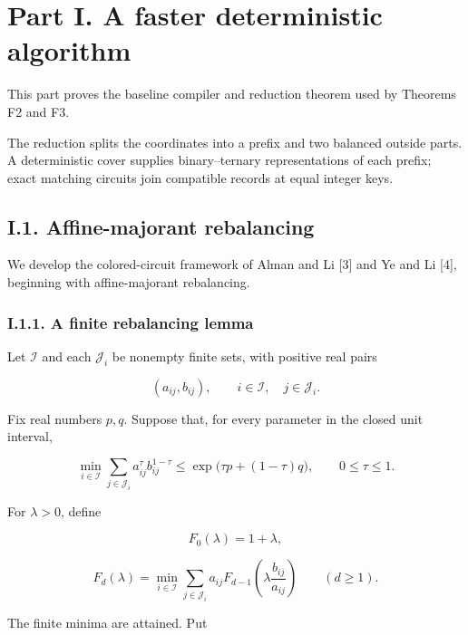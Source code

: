 \hypertarget{af-a9ec399514-part-i.-a-faster-deterministic-algorithm}{%
\section{Part I. A faster deterministic algorithm}\label{af-a9ec399514-part-i.-a-faster-deterministic-algorithm}}

This part proves the baseline compiler and reduction theorem used by Theorems F2 and F3.

The reduction splits the coordinates into a prefix and two balanced outside parts. A deterministic cover supplies binary--ternary representations of each prefix; exact matching circuits join compatible records at equal integer keys.

\hypertarget{af-a9ec399514-i.1.-affine-majorant-rebalancing}{%
\subsection{I.1. Affine-majorant rebalancing}\label{af-a9ec399514-i.1.-affine-majorant-rebalancing}}

We develop the colored-circuit framework of Alman and Li {[}3{]} and Ye and Li {[}4{]}, beginning with affine-majorant rebalancing.

\hypertarget{af-a9ec399514-i.1.1.-a-finite-rebalancing-lemma}{%
\subsubsection{I.1.1. A finite rebalancing lemma}\label{af-a9ec399514-i.1.1.-a-finite-rebalancing-lemma}}

Let \(\mathcal I\) and each \(\mathcal J_i\) be nonempty finite sets, with positive real pairs

\[
(a_{ij},b_{ij}),\qquad i\in\mathcal I,\quad j\in\mathcal J_i.
\]

Fix real numbers \(p,q\). Suppose that, for every parameter in the closed unit interval,

\[
\min_{i\in\mathcal I}\sum_{j\in\mathcal J_i}
       a_{ij}^{\tau}b_{ij}^{1-\tau}
\leq \exp\bigl(\tau p+(1-\tau)q\bigr),
\qquad 0\leq\tau\leq1.
\tag{1}
\]

For \(\lambda>0\), define

\[
F_0(\lambda)=1+\lambda,
\]

\[
F_d(\lambda)=
\min_{i\in\mathcal I}\sum_{j\in\mathcal J_i}
a_{ij}F_{d-1}\!\left(\lambda\frac{b_{ij}}{a_{ij}}\right)
\qquad(d\geq1).
\tag{2}
\]

The finite minima are attained. Put

